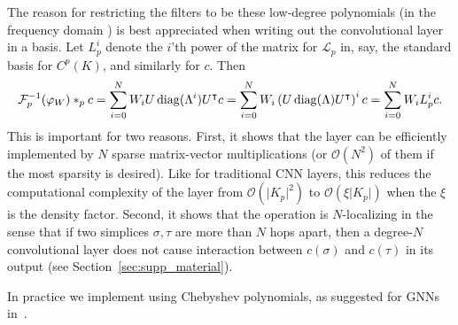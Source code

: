 The reason for restricting the filters to be these low-degree polynomials (in the frequency domain ) is best appreciated when writing out the convolutional layer in a basis. Let $L^i_p$ denote the $i$'th power of the matrix for $\mathcal{L}_p$ in, say, the standard basis for $C^p(K)$, and similarly for $c$. Then
\begin{equation}
  \mathcal{F}^{-1}_p(\varphi_W)\ast_p c = \sum_{i=0}^N W_iU\operatorname{diag}(\Lambda^i)U^{\intercal} c = \sum_{i=0}^N W_i\left(U\operatorname{diag}(\Lambda)U^{\intercal}\right)^i c = \sum_{i=0}^NW_iL^i_pc. \label{eq:filter}
\end{equation}
This is important for two reasons. First, it shows that the layer can be efficiently implemented by $N$ sparse matrix-vector multiplications (or $\mathcal{O}(N^2)$ of them if the most sparsity is desired). Like for traditional CNN layers, this reduces the computational complexity of the layer from $\mathcal{O}(\lvert K_p\rvert^2)$ to $\mathcal{O}(\xi\lvert K_p\rvert)$ when the $\xi$ is the density factor. Second, it shows that the operation is $N$-localizing in the sense that if two simplices $\sigma,\tau$ are more than $N$ hops apart, then a degree-$N$ convolutional layer does not cause interaction between $c(\sigma)$ and $c(\tau)$ in its output (see Section~\ref{sec:supp_material}).

In practice we implement  using Chebyshev polynomials, as suggested for GNNs in~\cite{defferrard2016convolutional}.

